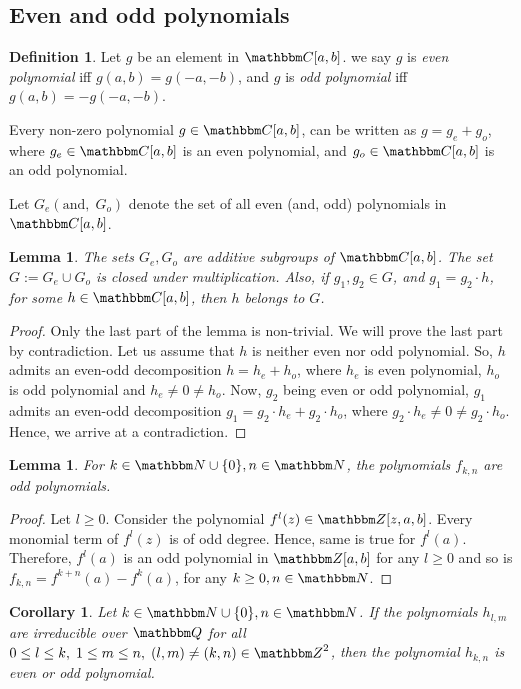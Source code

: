 \documentclass[reqno]{amsart}
\numberwithin{equation}{section}
\theoremstyle{plain}
\newtheorem{lemma}[theorem]{Lemma}
\newtheorem{corollary}[theorem]{Corollary}
\theoremstyle{definition}
\newtheorem{definition}[theorem]{Definition}
\theoremstyle{definition}
\newcommand{\Q}{{\mathbbm Q}}
\newcommand{\Z}{{\mathbbm Z}}
\newcommand{\C}{{\mathbbm C}}
\newcommand{\N}{{\mathbbm N}}
\begin{document}
\subsection{Even and odd polynomials}\label{cubic}
    \begin{definition}
        Let $g$ be an element in $\C[a,b]$. we say $g$ is \emph{even polynomial} iff $g(a,b)=g(-a,-b)$, and $g$ is \emph{odd polynomial} iff $g(a,b)=-g(-a,-b)$.
    \end{definition}
    Every non-zero polynomial $g\in \C[a,b]$, can be written as $g=g_{e}+g_{o}$, where $g_{e}\in \C[a,b]$ is an even polynomial, and $g_{o}\in \C[a,b]$ is an odd polynomial.

    Let $G_{e}(\text{and},\; G_{o})$ denote the set of all even (and, odd) polynomials in $\C[a,b]$.
    \begin{lemma}\label{evenodddecomp}
        The sets $G_{e}, G_{o}$ are additive subgroups of $\C[a,b]$. The set $G:= G_{e}\cup G_{o}$ is closed under multiplication.  Also, if $g_{1},g_{2}\in G$, and $g_{1}=g_{2}\cdot h$, for some $h\in \C[a,b]$, then $h$ belongs to $G$.
    \end{lemma}
    \begin{proof}
        Only the last part of the lemma is non-trivial. We will prove the last part by contradiction. Let us assume that $h$ is neither even nor odd polynomial. So, $h$ admits an even-odd decomposition $h= h_{e} + h_{o}$, where $h_{e}$ is even polynomial, $h_{o}$ is odd polynomial and $h_{e} \neq 0 \neq h_{o}$. Now, $g_{2}$ being even or odd polynomial, $g_{1}$ admits an even-odd decomposition $g_{1} = g_{2} \cdot h_{e} + g_{2} \cdot h_{o}$, where $g_{2} \cdot h_{e} \neq 0 \neq g_{2}\cdot h_{o}$. Hence, we arrive at a contradiction. 
    \end{proof}
    \begin{lemma} \label{r}
        For $k\in \N\cup \{0\},n\in \N$, the polynomials $f_{k,n}$ are odd polynomials.
    \end{lemma}
    \begin{proof}
        Let $l\geq 0$. Consider the polynomial $f^{l}(z)\in \Z[z,a,b]$. Every monomial term of $f^{l}(z)$ is of odd degree. Hence, same is true for $f^{l}(a)$. Therefore, $f^{l}(a)$ is an odd polynomial in $\Z[a,b]$ for any $l\geq 0$ and so is $f_{k,n}= f^{k+n}(a)-f^{k}(a)$, for any $k \geq 0,n \in \N$. 
    \end{proof}
    \begin{corollary}\label{s}
        Let $k\in \N\cup \{0\}, n\in \N$. If the polynomials $h_{l,m}$ are irreducible over $\Q$ for all $0\leq l\leq k,\; 1\leq m \leq n,\; (l,m)\neq (k,n) \in \Z^{2}$, then the polynomial $h_{k,n}$ is even or odd polynomial.
    \end{corollary}
\end{document}
